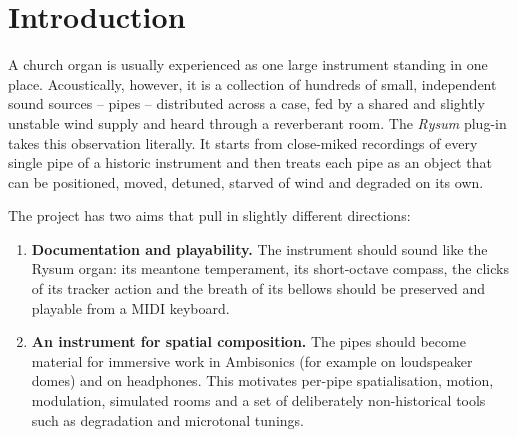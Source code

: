 \documentclass[11pt,a4paper,parskip=half,DIV=11,toc=bibliography]{scrartcl}
\begin{document}
\setcounter{tocdepth}{1}
\tableofcontents
\clearpage

\section{Introduction}

A church organ is usually experienced as one large instrument standing in one place. Acoustically,
however, it is a collection of hundreds of small, independent sound sources -- pipes -- distributed
across a case, fed by a shared and slightly unstable wind supply and heard through a reverberant
room. The \emph{Rysum} plug-in takes this observation literally. It starts from close-miked
recordings of every single pipe of a historic instrument and then treats each pipe as an object
that can be positioned, moved, detuned, starved of wind and degraded on its own.

The project has two aims that pull in slightly different directions:
\begin{enumerate}
  \item \textbf{Documentation and playability.} The instrument should sound like the Rysum organ:
        its meantone temperament, its short-octave compass, the clicks of its tracker action and
        the breath of its bellows should be preserved and playable from a MIDI keyboard.
  \item \textbf{An instrument for spatial composition.} The pipes should become material for
        immersive work in Ambisonics (for example on loudspeaker domes) and on headphones. This
        motivates per-pipe spatialisation, motion, modulation, simulated rooms and a set of
        deliberately non-historical tools such as degradation and microtonal tunings.
\end{enumerate}
\end{document}
